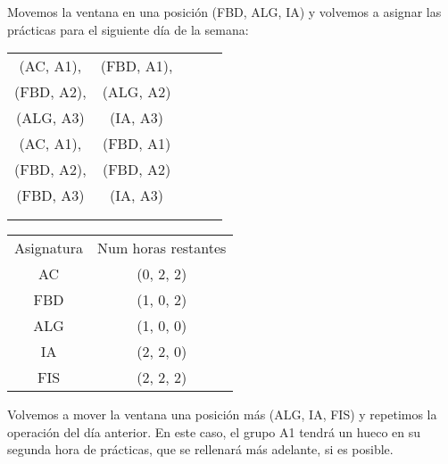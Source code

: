Movemos la ventana en una posición (FBD, ALG, IA) y volvemos a asignar las prácticas para el siguiente día de la semana:

\begin{minipage}{0.5\textwidth}    
\begin{tabular}{| c | c | c | c | c |}
\hline
 (AC, A1), & (FBD, A1), &  &  & \\
 (FBD, A2), & (ALG, A2) &  &  & \\
 (ALG, A3) &  (IA, A3) &  &  & \\
 \hline
 (AC, A1), & (FBD, A1) &  &  & \\
 (FBD, A2), & (FBD, A2) &  &  & \\
 (FBD, A3) & (IA, A3) &  &  & \\
 \hline
 &  &  &  & \\
 \hline
 &  &  &  & \\
 \hline 
\end{tabular}
\end{minipage}
\begin{minipage}{0.5\textwidth}
\begin{tabular}{c | c}
Asignatura & Num horas restantes \\
AC & (0, 2, 2) \\
FBD & (1, 0, 2) \\
ALG & (1, 0, 0) \\
IA & (2, 2, 0) \\
FIS & (2, 2, 2)
\end{tabular}
\end{minipage}

Volvemos a mover la ventana una posición más (ALG, IA, FIS) y repetimos la operación del día anterior. En este caso, el grupo A1 tendrá un hueco en su segunda hora de prácticas, que se rellenará más adelante, si es posible.

